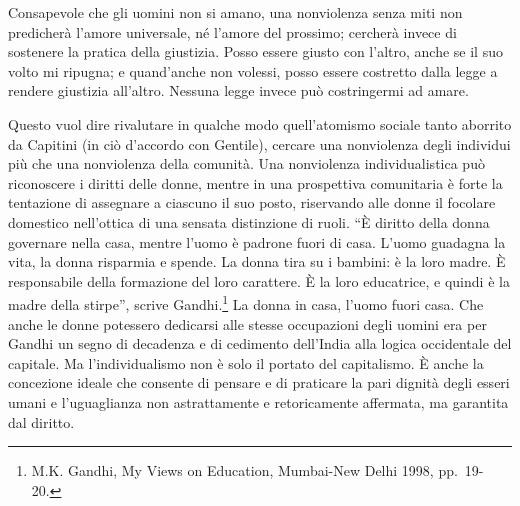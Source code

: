 \documentclass[12pt,oneside,openany]{book}
\begin{document}
Consapevole che gli uomini non si amano, una nonviolenza senza miti non predicherà l'amore universale, né l'amore del prossimo; cercherà invece di sostenere la pratica della giustizia. Posso essere giusto con l'altro, anche se il suo volto mi ripugna; e quand'anche non volessi, posso essere costretto dalla legge a rendere giustizia all'altro. Nessuna legge invece può costringermi ad amare.



Questo vuol dire rivalutare in qualche modo quell'atomismo sociale tanto aborrito da Capitini (in ciò d'accordo con Gentile), cercare una nonviolenza degli individui più che una nonviolenza della comunità. Una nonviolenza individualistica può riconoscere i diritti delle donne, mentre in una prospettiva comunitaria è forte la tentazione di assegnare a ciascuno il suo posto, riservando alle donne il focolare domestico nell'ottica di una sensata distinzione di ruoli. ``È diritto della donna governare nella casa, mentre l'uomo è padrone fuori di casa. L'uomo guadagna la vita, la donna risparmia e spende. La donna tira su i bambini: è la loro madre. È responsabile della formazione del loro carattere. È la loro educatrice, e quindi è la madre della stirpe'', scrive Gandhi.\footnote{M.K. Gandhi, My Views on Education, Mumbai-New Delhi 1998, pp.~19-20.} La donna in casa, l'uomo fuori casa. Che anche le donne potessero dedicarsi alle stesse occupazioni degli uomini era per Gandhi un segno di decadenza e di cedimento dell'India alla logica occidentale del capitale. Ma l'individualismo non è solo il portato del capitalismo. È anche la concezione ideale che consente di pensare e di praticare la pari dignità degli esseri umani e l'uguaglianza non astrattamente e retoricamente affermata, ma garantita dal diritto.
\end{document}
